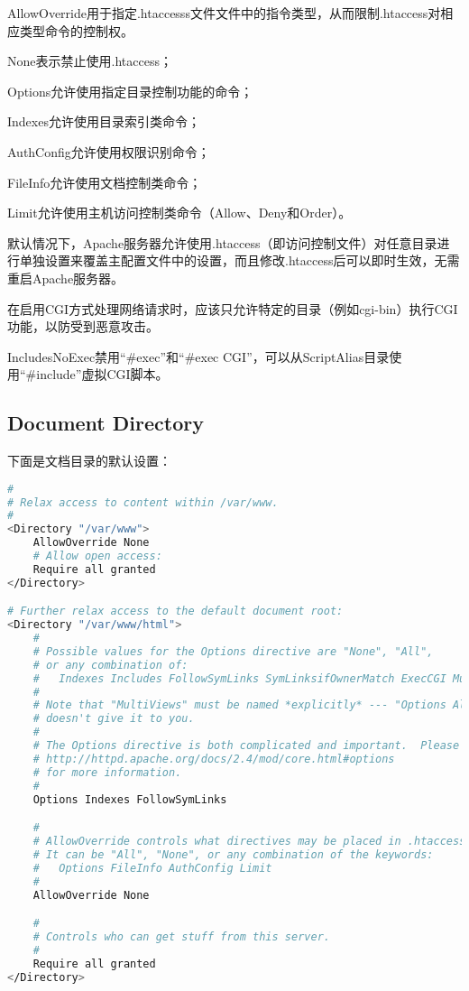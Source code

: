 AllowOverride用于指定.htaccesss文件文件中的指令类型，从而限制.htaccess对相应类型命令的控制权。

\begin{compactitem}
\item None表示禁止使用.htaccess；
\item Options允许使用指定目录控制功能的命令；
\item Indexes允许使用目录索引类命令；
\item AuthConfig允许使用权限识别命令；
\item FileInfo允许使用文档控制类命令；
\item Limit允许使用主机访问控制类命令（Allow、Deny和Order）。
\end{compactitem}

默认情况下，Apache服务器允许使用.htaccess（即访问控制文件）对任意目录进行单独设置来覆盖主配置文件中的设置，而且修改.htaccess后可以即时生效，无需重启Apache服务器。

在启用CGI方式处理网络请求时，应该只允许特定的目录（例如cgi-bin）执行CGI功能，以防受到恶意攻击。

IncludesNoExec禁用“\#exec”和“\#exec CGI”，可以从ScriptAlias目录使用“\#include”虚拟CGI脚本。





\subsection{Document Directory}

下面是文档目录的默认设置：

\begin{lstlisting}[language=bash]
#
# Relax access to content within /var/www.
#
<Directory "/var/www">
    AllowOverride None
    # Allow open access:
    Require all granted
</Directory>

# Further relax access to the default document root:
<Directory "/var/www/html">
    #
    # Possible values for the Options directive are "None", "All",
    # or any combination of:
    #   Indexes Includes FollowSymLinks SymLinksifOwnerMatch ExecCGI MultiViews
    #
    # Note that "MultiViews" must be named *explicitly* --- "Options All"
    # doesn't give it to you.
    #
    # The Options directive is both complicated and important.  Please see
    # http://httpd.apache.org/docs/2.4/mod/core.html#options
    # for more information.
    #
    Options Indexes FollowSymLinks

    #
    # AllowOverride controls what directives may be placed in .htaccess files.
    # It can be "All", "None", or any combination of the keywords:
    #   Options FileInfo AuthConfig Limit
    #
    AllowOverride None

    #
    # Controls who can get stuff from this server.
    #
    Require all granted
</Directory>
\end{lstlisting}


